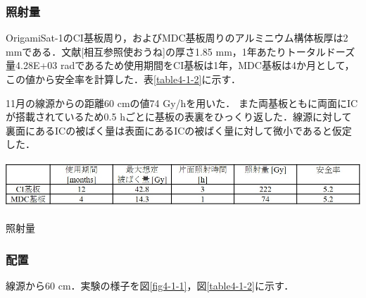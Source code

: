\subsubsection{照射量}
OrigamiSat-1のCI基板周り，およびMDC基板周りのアルミニウム構体板厚は2 mmである．文献[相互参照使おうね]の厚さ1.85 mm，1年あたりトータルドーズ量4.28E+03 radであるため使用期間をCI基板は1年，MDC基板は4か月として，この値から安全率を計算した．表\ref{table4-1-2}に示す．

11月の線源からの距離60 cmの値74 Gy/hを用いた．
また両基板ともに両面にICが搭載されているため0.5 hごとに基板の表裏をひっくり返した．線源に対して裏面にあるICの被ばく量は表面にあるICの被ばく量に対して微小であると仮定した．

\begin{table}[H]
	\centering
	\includegraphics[scale=0.9]{04/fig/t4-1-2.jpg}
	\caption{照射量}
	\label{table4-1-2}
\end{table}


\subsubsection{配置}
線源から60 cm．実験の様子を図\ref{fig4-1-1}，図\ref{table4-1-2}に示す．

